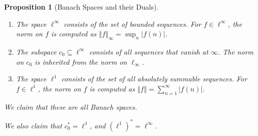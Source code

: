 \documentclass[10pt]{extarticle}
\newcommand{\norm}[1]{\left\Vert #1\right\Vert}
\theoremstyle{plain}
\newtheorem*{proposition}{Proposition}
\theoremstyle{definition}
\theoremstyle{note}
\renewcommand{\newline}{\hfill\break}
\begin{document}
\begin{proposition}[Banach Spaces and their Duals]\hfill
  \begin{enumerate}[(1)]
    \item The space $\ell^{\infty}$ consists of the set of bounded sequences. For $f\in \ell^{\infty}$, the norm on $f$ is computed as $\displaystyle\norm{f}_{\infty} = \sup_{n} \left\vert f(n) \right\vert$.
    \item The subspace $c_0\subseteq \ell^{\infty}$ consists of all sequences that vanish at $\infty$. The norm on $c_0$ is inherited from the norm on $\ell_{\infty}$.
    \item The space $\ell^{1}$ consists of the set of all absolutely summable sequences. For $f\in \ell^{1}$, the norm on $f$ is computed as $\displaystyle \norm{f} = \sum_{n=1}^{\infty}\left\vert f(n) \right\vert$.
  \end{enumerate}
  We claim that these are all Banach spaces.\newline

  We also claim that $c_0^{\ast} = \ell^1$, and $\left(\ell^{1}\right)^{\ast} = \ell^{\infty}$.
\end{proposition}
\end{document}
